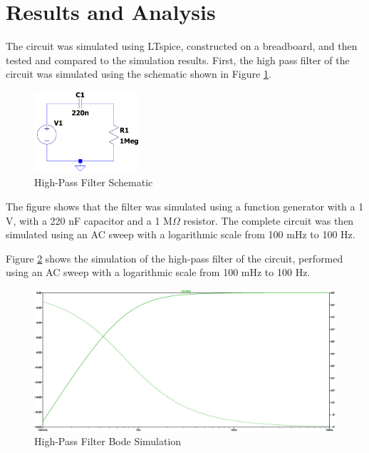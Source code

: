 \documentclass[CMPE]{KGCOEReport}
\begin{document}
\section*{Results and Analysis}

The circuit was simulated using LTspice, constructed on a breadboard, and then tested and compared to the simulation results. First, the high pass filter of the circuit was simulated using the schematic shown in Figure \ref{fig:ltspiceHighPassSchematic}.

\begin{figure}[H]
    \centering
    \includegraphics[width=0.35\textwidth]{HighPass.png}
    \caption{High-Pass Filter Schematic}
    \label{fig:ltspiceHighPassSchematic}
\end{figure}

The figure shows that the filter was simulated using a function generator with a 1 V, with a 220 nF capacitor and a 1 M$\Omega$ resistor. The complete circuit was then simulated using an AC sweep with a logarithmic scale from 100 mHz to 100 Hz.

Figure \ref{fig:highPassSim} shows the simulation of the high-pass filter of the circuit, performed using an AC sweep with a logarithmic scale from 100 mHz to 100 Hz.

\begin{figure}[H]
    \centering
    \includegraphics[width=1\textwidth]{SimFreqHighPass.png}
    \caption{High-Pass Filter Bode Simulation}
    \label{fig:highPassSim}
\end{figure}
\end{document}
